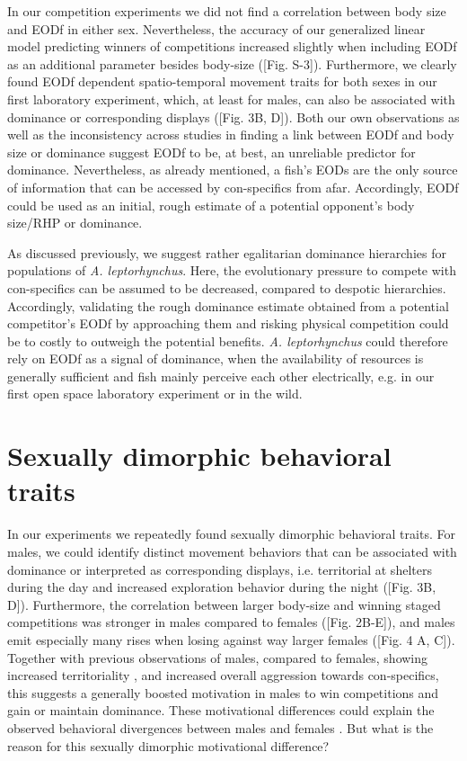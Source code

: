\documentclass[11pt,pdftex]{article}
\newcommand{\note}[2][]{\textcolor{red!80!black}{[\textbf{\ifthenelse{\equal{#1}{}}{}{#1: }}#2]}}
\newcommand{\notetr}[1]{\note[TR]{#1}}
\newcommand{\lepto}{\textit{A. leptorhynchus}}
\begin{document}
In our competition experiments we did not find a correlation between body size and EODf in either sex. Nevertheless, the accuracy of our generalized linear model predicting winners of competitions increased slightly when including EODf as an additional parameter besides body-size (\notetr{Fig. S-3}). Furthermore, we clearly found EODf dependent spatio-temporal movement traits for both sexes in our first laboratory experiment, which, at least for males, can also be associated with dominance or corresponding displays (\notetr{Fig. 3B, D}). Both our own observations as well as the inconsistency across studies in finding a link between EODf and body size or dominance suggest EODf to be, at best, an unreliable predictor for dominance. Nevertheless, as already mentioned, a fish's EODs are the only source of information that can be accessed by con-specifics from afar. Accordingly, EODf could be used as an initial, rough estimate of a potential opponent's body size/RHP or dominance. 

As discussed previously, we suggest rather egalitarian dominance hierarchies for populations of \lepto{}. Here, the evolutionary pressure to compete with con-specifics can be assumed to be decreased, compared to despotic hierarchies. Accordingly, validating the rough dominance estimate obtained from a potential competitor's EODf by approaching them and risking physical competition could be to costly to outweigh the potential benefits. \lepto{} could therefore rely on EODf as a signal of dominance, when the availability of resources is generally sufficient and fish mainly perceive each other electrically, e.g. in our first open space laboratory experiment or in the wild.

\section{Sexually dimorphic behavioral traits}

In our experiments we repeatedly found sexually dimorphic behavioral traits. For males, we could identify distinct movement behaviors that can be associated with dominance or interpreted as corresponding displays, i.e. territorial at shelters during the day and increased exploration behavior during the night (\notetr{Fig. 3B, D}). Furthermore, the correlation between larger body-size and winning staged competitions was stronger in males compared to females (\notetr{Fig. 2B-E}), and males emit especially many rises when losing against way larger females (\notetr{Fig. 4 A, C}). Together with previous observations of males, compared to females, showing increased territoriality \citep{Dunlap2002}, and increased overall aggression towards con-specifics, this suggests a generally boosted motivation in males to win competitions and gain or maintain dominance. These motivational differences could explain the observed behavioral divergences between males and females \citep{ArnottElwood2008}. But what is the reason for this sexually dimorphic motivational difference? 
\end{document}
